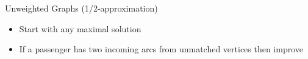 \begin{frame}{Unweighted Graphs (1/2-approximation)}
\begin{itemize}
  \item Start with any maximal solution
  \item If a passenger has two incoming arcs from unmatched vertices then
  improve
\end{itemize}
\centering

\end{frame}